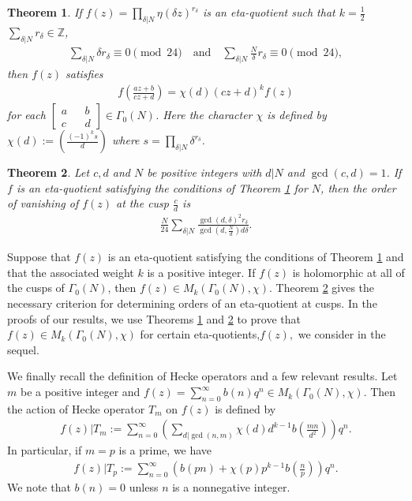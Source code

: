 \documentclass[12pt]{amsart}
\theoremstyle{plain}
\newtheorem{theorem}{Theorem}[section]
\theoremstyle{definition}
\begin{document}
	\begin{theorem} \cite[Theorem 1.64]{Ono2004} \label{thm2.3}
		If $f(z)=\prod\limits_{\delta|N} \eta(\delta z)^{r_{\delta}}$ is an eta-quotient such that $k= \frac 12$ $\sum_{\delta|N} r_{\delta}\in \mathbb{Z}$, 
		\begin{align*}
			\sum\limits_{\delta|N} \delta r_{\delta} \equiv 0\pmod {24}	\quad \textrm{and} \quad \sum\limits_{\delta|N} \frac{N}{\delta}r_{\delta} \equiv 0\pmod {24},
		\end{align*}
		then $f(z)$ satisfies
		\begin{align*}
			f \left( \frac{az+b}{cz+d}\right)=\chi(d) (cz+d)^{k} f(z)
		\end{align*}
		for each $\begin{bmatrix}
			a && b \\c && d
		\end{bmatrix}\in \Gamma_{0}(N)$. Here the character $\chi$ is defined by $\chi(d):= \left(\frac{(-1)^{k}s}{d}\right)$ where $s=\prod_{\delta|N} \delta ^{r_{\delta}}$.
	\end{theorem}
	
	\begin{theorem} \cite[Theorem 1.65]{Ono2004} \label{thm2.4}
		Let $c,d$ and $N$ be positive integers with $d|N$ and $\gcd(c,d)=1$. If $f$ is an eta-quotient satisfying the conditions of Theorem \ref{thm2.3} for $N$, then the order of vanishing of $f(z)$ at the cusp $\frac{c}{d}$ is
		\begin{align*}
			\frac{N}{24}\sum\limits_{\delta|N} \frac{\gcd(d, \delta)^2 r_{\delta}}{\gcd(d, \frac{N}{ d} )d \delta}.
		\end{align*}
	\end{theorem}
	Suppose that $f(z)$ is an eta-quotient satisfying the conditions of Theorem \ref{thm2.3} and that the associated weight $k$ is a positive integer. If $f(z)$ is holomorphic at all of the cusps of $\Gamma_0(N)$, then $f(z) \in M_{k}(\Gamma_0(N), \chi)$. Theorem \ref{thm2.4} gives the necessary criterion for determining orders of an eta-quotient at cusps. In the proofs of our results, we use Theorems \ref{thm2.3} and \ref{thm2.4} to prove that $f(z) \in M_{k}(\Gamma_0(N), \chi)$ for certain eta-quotients,$f(z),$ we consider in the sequel.
	
	
	
	
	We finally recall the definition of Hecke operators and a few relevant results. Let $m$ be a positive integer and $f(z)= \sum \limits_{n= 0}^{\infty}b(n) q^{n}\in M_{k}(\Gamma_0(N), \chi)$. Then the action of Hecke operator $T_m$ on $f(z)$ is defined by
	\begin{align*}
		f(z)|T_{m} := \sum \limits_{n= 0}^{\infty} \left(\sum \limits_{d|\gcd(n,m)} \chi(d) d^{k-1} b\left(\frac{mn}{d^2}\right)\right)q^{n}.
	\end{align*}
	In particular, if $m=p$ is a prime, we have
	\begin{align*}
		f(z)|T_p := \sum \limits_{n= 0}^{\infty}\left( b(pn) + \chi(p) p^{k-1} b\left(\frac{n}{p}\right)\right)q^{n}.
	\end{align*}
	We note that $b(n)=0$ unless $n$ is a nonnegative integer.
\end{document}
